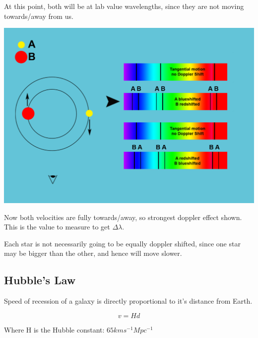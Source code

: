 \documentclass[a4paper, 12pt]{article}
\begin{document}
At this point, both will be at lab value wavelengths, since they are not moving towards/away from us.

\begin{center}
\includegraphics[height=0.4\textheight]{images/spectralBin2.png}
\end{center}

Now both velocities are fully towards/away, so strongest doppler effect shown. This is the value to measure to get $\Delta \lambda$.

Each star is not necessarily going to be equally doppler shifted, since one star may be bigger than the other, and hence will move slower.

\subsection{Hubble's Law}

Speed of recession of a galaxy is directly proportional to it's distance from Earth.

$$
v = Hd
$$

Where H is the Hubble constant: $65 kms^{-1} Mpc^{-1}$
\end{document}
